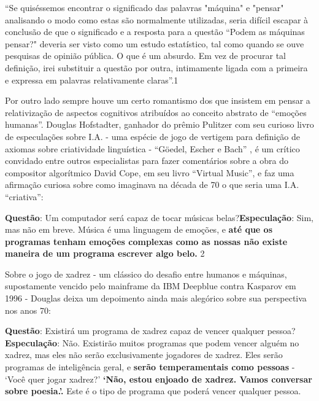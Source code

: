\documentclass[
	12pt,				%
	openright,			%
	twoside,			%
	a4paper,			%
	english,			%
	french,				%
	spanish,			%
	brazil				%
	]{abntex2}
\begin{document}
\begin{citacao}
“Se  quiséssemos encontrar o significado das palavras "máquina" e "pensar"  analisando o modo como estas são normalmente  utilizadas, seria difícil  escapar à conclusão  de  que o significado e a resposta  para a questão “Podem as máquinas pensar?" deveria ser visto como um estudo estatístico, tal como  quando se ouve pesquisas de opinião pública.  O que é um absurdo. Em vez de  procurar tal definição, irei substituir a questão por outra, intimamente  ligada   com  a  primeira  e  expressa  em  palavras  relativamente claras”.1 \cite[grifo nosso.]{turing1950computing}
\end{citacao}

Por outro lado sempre houve um certo romantismo dos que insistem em pensar a relativização de aspectos cognitivos atribuídos ao conceito abstrato de “emoções humanas”. Douglas Hofstadter, ganhador do prêmio Pulitzer com seu curioso livro de especulações sobre I.A. - uma espécie de jogo de vertigem para definição de axiomas sobre criatividade linguística - “Göedel, Escher e Bach” \cite{hofstadter2000godel}, é um crítico convidado entre outros especialistas para fazer comentários sobre a obra do compositor algorítmico David Cope, em seu livro “Virtual Music”\cite{cope2004virtual}, e faz uma afirmação curiosa sobre como imaginava na década de 70 o que seria uma I.A. “criativa”:

\begin{citacao}
\textbf{Questão}: Um computador será capaz de tocar músicas belas?\linebreak\textbf{Especulação}: Sim, mas não em breve. Música é uma linguagem de emoções, e \textbf{até que os programas tenham emoções complexas como as nossas não existe maneira de um programa escrever algo belo.} 2 \cite[p.36 grifos nossos]{hofstadter2004virtualstaringemmy}
\end{citacao} 

Sobre o jogo de xadrez - um clássico do desafio entre humanos e máquinas, supostamente vencido pelo mainframe da IBM Deepblue contra Kasparov em 1996 - Douglas deixa um depoimento ainda mais alegórico sobre sua perspectiva nos anos 70:

\begin{citacao}
\textbf{Questão}: Existirá um programa de xadrez capaz de vencer qualquer pessoa?\linebreak\textbf{Especulação}: Não. Existirão muitos programas que podem vencer alguém no xadrez, mas eles não serão exclusivamente jogadores de xadrez. Eles serão programas de inteligência geral, e \textbf{serão temperamentais como pessoas} - ‘Você quer jogar xadrez?’ \textbf{‘Não, estou enjoado de xadrez. Vamos conversar sobre poesia.’.} Este é o tipo de programa que poderá vencer qualquer pessoa.  \cite[p.34 grifos nossos]{hofstadter2004virtualstaringemmy}

\end{citacao}
\end{document}
